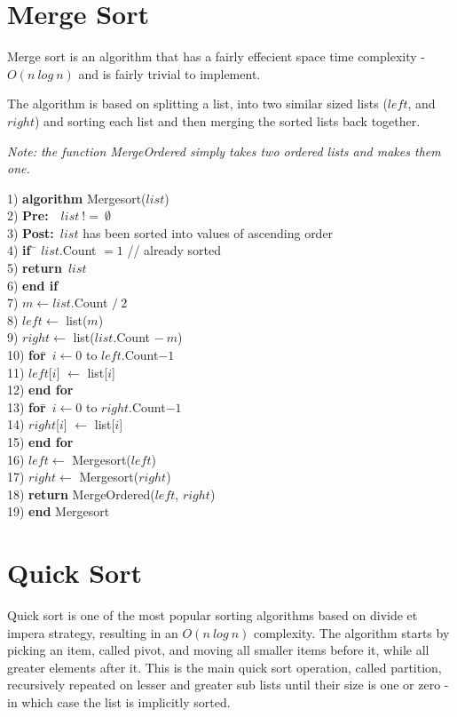\newpage
\section{Merge Sort}
Merge sort is an algorithm that has a fairly effecient space time complexity - $O(n~log~n)$ and is fairly trivial to implement.

The algorithm is based on splitting a list, into two similar sized lists ($left$, and $right$) and sorting each list and then merging the sorted lists back together.

\textit{Note: the function MergeOrdered simply takes two ordered lists and makes them one.}

\begin{tabbing}
1)  \textbf{alg}\= \textbf{orithm} Mergesort($list$) \\
2)  \> \textbf{Pre:}~~$list~!=~\emptyset$ \\
3)  \> \textbf{Post:}~$list$ has been sorted into values of ascending order \\
4)  \> \textbf{if}~\= $list$.Count $= 1$ // already sorted \\
5)  \> \> \textbf{return}~$list$ \\
6)  \> \textbf{end if} \\
7)  \> $m \leftarrow list$.Count $/~2$ \\
8)  \> $left \leftarrow$ list($m$) \\
9)  \> $right \leftarrow$ list($list$.Count $-~m$) \\
10) \> \textbf{for}\=~$i \leftarrow 0$ to $left$.Count$-1$ \\
11) \> \> $left$[$i$] $\leftarrow$ list[$i$] \\
12) \> \textbf{end for} \\
13) \> \textbf{for}\=~$i \leftarrow 0$ to $right$.Count$-1$ \\
14) \> \> $right$[$i$] $\leftarrow$ list[$i$] \\
15) \> \textbf{end for} \\
16) \> $left \leftarrow$ Mergesort($left$) \\
17) \> $right \leftarrow$ Mergesort($right$) \\
18) \> \textbf{return} MergeOrdered($left$, $right$) \\
19) \textbf{end} Mergesort \\
\end{tabbing}

\newpage
\section{Quick Sort} 
Quick sort is one of the most popular sorting algorithms based on divide et impera strategy, resulting in an $O(n~log~n)$ complexity. The algorithm starts by picking an item, called pivot, and moving all smaller items before it, while all greater elements after it. This is the main quick sort operation, called partition, recursively repeated on lesser and greater sub lists until their size  is one or zero - in which case the list is implicitly sorted.

